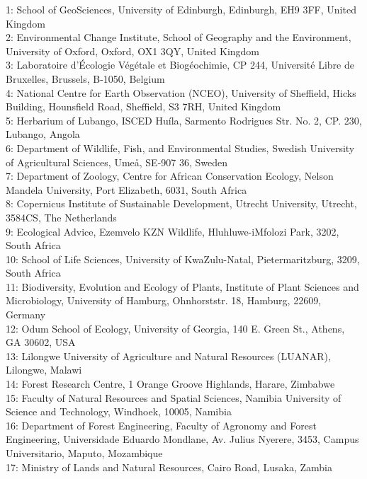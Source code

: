 \documentclass[11pt,a4paper]{article}
\begin{document}
1: School of GeoSciences, University of Edinburgh, Edinburgh, EH9 3FF, United Kingdom \\
2: Environmental Change Institute, School of Geography and the Environment, University of Oxford, Oxford, OX1 3QY, United Kingdom \\
3: Laboratoire d'\'{E}cologie V\'{e}g\'{e}tale et Biogéochimie, CP 244, Universit\'{e} Libre de Bruxelles, Brussels, B-1050, Belgium \\
4: National Centre for Earth Observation (NCEO), University of Sheffield, Hicks Building, Hounsfield Road, Sheffield, S3 7RH, United Kingdom \\
5: Herbarium of Lubango, ISCED Hu\'{i}la, Sarmento Rodrigues Str. No. 2, CP. 230, Lubango, Angola \\
6: Department of Wildlife, Fish, and Environmental Studies, Swedish University of Agricultural Sciences, Ume\aa, SE-907 36, Sweden \\
7: Department of Zoology, Centre for African Conservation Ecology, Nelson Mandela University, Port Elizabeth, 6031, South Africa \\
8: Copernicus Institute of Sustainable Development, Utrecht University, Utrecht, 3584CS, The Netherlands \\
9: Ecological Advice, Ezemvelo KZN Wildlife, Hluhluwe-iMfolozi Park, 3202, South Africa \\
10: School of Life Sciences, University of KwaZulu-Natal, Pietermaritzburg, 3209, South Africa \\
11: Biodiversity, Evolution and Ecology of Plants, Institute of Plant Sciences and Microbiology, University of Hamburg, Ohnhorststr. 18, Hamburg, 22609, Germany \\
12: Odum School of Ecology, University of Georgia, 140 E. Green St., Athens, GA 30602, USA \\
13: Lilongwe University of Agriculture and Natural Resources (LUANAR), Lilongwe, Malawi \\
14: Forest Research Centre, 1 Orange Groove Highlands, Harare, Zimbabwe \\
15: Faculty of Natural Resources and Spatial Sciences, Namibia University of Science and Technology, Windhoek, 10005, Namibia \\
16: Department of Forest Engineering, Faculty of Agronomy and Forest Engineering, Universidade Eduardo Mondlane, Av. Julius Nyerere, 3453, Campus Universitario, Maputo, Mozambique \\
17: Ministry of Lands and Natural Resources, Cairo Road, Lusaka, Zambia \\
\end{document}
